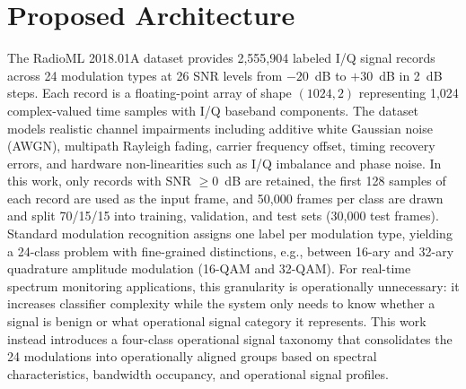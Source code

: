 \documentclass[conference]{IEEEtran}
\begin{document}
\section{Proposed Architecture}
The RadioML 2018.01A dataset \cite{b3} provides 2,555,904 labeled I/Q signal records across 24 modulation types at 26 SNR levels from $-20$~dB to $+30$~dB in 2~dB steps. Each record is a floating-point array of shape $(1024, 2)$ representing 1,024 complex-valued time samples with I/Q baseband components. The dataset models realistic channel impairments including additive white Gaussian noise (AWGN), multipath Rayleigh fading, carrier frequency offset, timing recovery errors, and hardware non-linearities such as I/Q imbalance and phase noise. In this work, only records with SNR $\geq 0$~dB are retained, the first 128 samples of each record are used as the input frame, and 50,000 frames per class are drawn and split 70/15/15 into training, validation, and test sets (30,000 test frames).
Standard modulation recognition assigns one label per modulation type, yielding a 24-class problem with fine-grained distinctions, e.g., between 16-ary and 32-ary quadrature amplitude modulation (16-QAM and 32-QAM). For real-time spectrum monitoring applications, this granularity is operationally unnecessary: it increases classifier complexity while the system only needs to know whether a signal is benign or what operational signal category it represents. This work instead introduces a four-class operational signal taxonomy that consolidates the 24 modulations into operationally aligned groups based on spectral characteristics, bandwidth occupancy, and operational signal profiles.
\end{document}
